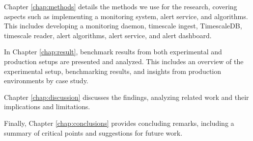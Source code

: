 Chapter \ref{chap:methods} details the methods we use for the research, covering aspects such as implementing a monitoring system, alert service, and algorithms. This includes developing a monitoring daemon, timescale ingest, TimescaleDB, timescale reader, alert algorithms, alert service, and alert dashboard.

In Chapter \ref{chap:result}, benchmark results from both experimental and production setups are presented and analyzed. This includes an overview of the experimental setup, benchmarking results, and insights from production environments by case study.

Chapter \ref{chap:discussion} discusses the findings, analyzing related work and their implications and limitations.

Finally, Chapter \ref{chap:conclusions} provides concluding remarks, including a summary of critical points and suggestions for future work.
